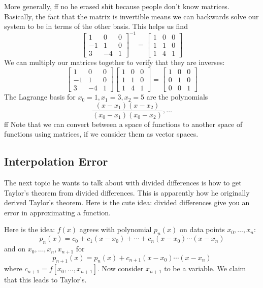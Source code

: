 \documentclass{article}
\theoremstyle{plain}
\theoremstyle{remark}
\begin{document}
More generally,
ff no he erased shit because people don't know matrices.
Basically, the fact that the matrix is invertible means we can
backwards solve our system to be in terms of the other basis.
This helps us find
\[
	\begin{bmatrix} 1 & 0 & 0\\ -1 & 1 & 0 \\ 3 & -4 & 1 \end{bmatrix}^{-1}
	= \begin{bmatrix} 1 & 0 & 0 \\ 1 & 1 & 0 \\ 1 & 4 & 1 \end{bmatrix}
\]
We can multiply our matrices together to verify that they are inverses:
\[
	\begin{bmatrix} 1 & 0 & 0\\ -1 & 1 & 0 \\ 3 & -4 & 1 \end{bmatrix}
	\begin{bmatrix} 1 & 0 & 0 \\ 1 & 1 & 0 \\ 1 & 4 & 1 \end{bmatrix}
	= \begin{bmatrix} 1 & 0 & 0 \\ 0 & 1 & 0 \\ 0 & 0 & 1\end{bmatrix}
\]
The Lagrange basis for $x_0 = 1, x_1 = 3, x_2 =5$
are the polynomials
\[
	\frac{(x-x_1)(x-x_2)}{(x_0-x_1)(x_0-x_2)}, \dots
\]
ff
Note that we can convert between a space of functions
to another space of functions using matrices, if we consider them as vector spaces.

\subsection{Interpolation Error}
The next topic he wants to talk about with divided differences is
how to get Taylor's theorem from divided differences.
This is apparently how he originally derived Taylor's theorem.
Here is the cute idea: divided differences give you an error in approximating a function.

Here is the idea:
$f(x)$ agrees with polynomial $p_n(x)$ on data points $x_0,\dots,x_n$:
\[
	p_n(x) = c_0 + c_1(x-x_0) + \cdots + c_n(x-x_0)\cdots(x-x_n)
\]
and on $x_0,\dots,x_n,x_{n+1}$ for
\[
	p_{n+1}(x) = p_n(x) + c_{n+1}(x-x_0)\cdots(x-x_n)
\]
where $c_{n+1} = f[x_0,\dots,x_{n+1}]$.
Now consider $x_{n+1}$ to be a variable.
We claim that this leads to Taylor's.
\end{document}
